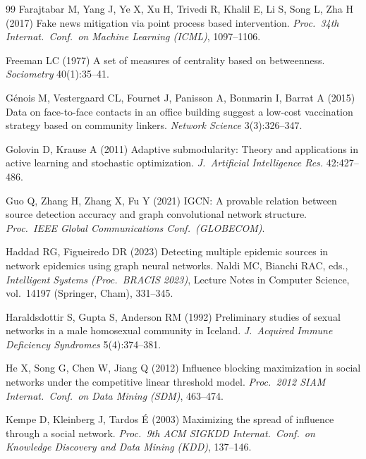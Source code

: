 \documentclass[ijoc,sglanonrev]{informs4}
\begin{document}
\begin{thebibliography}{99}
Farajtabar M, Yang J, Ye X, Xu H, Trivedi R, Khalil E, Li S, Song L, Zha H
  (2017) Fake news mitigation via point process based intervention.
  \emph{Proc.\ 34th Internat.\ Conf.\ on Machine Learning (ICML)},
  1097--1106.

Freeman LC (1977) A set of measures of centrality based on betweenness.
  \emph{Sociometry} 40(1):35--41.

G\'enois M, Vestergaard CL, Fournet J, Panisson A, Bonmarin I, Barrat A
  (2015) Data on face-to-face contacts in an office building suggest a
  low-cost vaccination strategy based on community linkers. \emph{Network
  Science} 3(3):326--347.

Golovin D, Krause A (2011) Adaptive submodularity: Theory and applications
  in active learning and stochastic optimization. \emph{J.\ Artificial
  Intelligence Res.} 42:427--486.

Guo Q, Zhang H, Zhang X, Fu Y (2021) IGCN: A provable relation between
  source detection accuracy and graph convolutional network structure.
  \emph{Proc.\ IEEE Global Communications Conf.\ (GLOBECOM)}.

Haddad RG, Figueiredo DR (2023) Detecting multiple epidemic sources in
  network epidemics using graph neural networks. Naldi MC, Bianchi RAC,
  eds., \emph{Intelligent Systems (Proc.\ BRACIS 2023)}, Lecture Notes in
  Computer Science, vol.\ 14197 (Springer, Cham), 331--345.

Haraldsdottir S, Gupta S, Anderson RM (1992) Preliminary studies of sexual
  networks in a male homosexual community in Iceland. \emph{J.\ Acquired
  Immune Deficiency Syndromes} 5(4):374--381.

He X, Song G, Chen W, Jiang Q (2012) Influence blocking maximization in
  social networks under the competitive linear threshold model.
  \emph{Proc.\ 2012 SIAM Internat.\ Conf.\ on Data Mining (SDM)}, 463--474.

Kempe D, Kleinberg J, Tardos {\'E} (2003) Maximizing the spread of influence
  through a social network. \emph{Proc.\ 9th ACM SIGKDD Internat.\ Conf.\ on
  Knowledge Discovery and Data Mining (KDD)}, 137--146.


\end{thebibliography}
\end{document}
